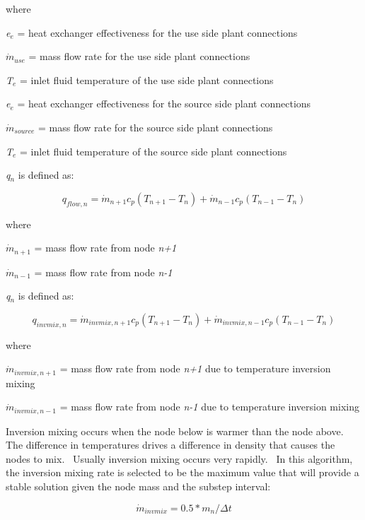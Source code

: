 where

\emph{e\(_{e}\)} = heat exchanger effectiveness for the use side plant connections

\({\dot m_{use}}\) = mass flow rate for the use side plant connections

\emph{T\(_{e}\)} = inlet fluid temperature of the use side plant connections

\emph{e\(_{e}\)} = heat exchanger effectiveness for the source side plant connections

\({\dot m_{source}}\) = mass flow rate for the source side plant connections

\emph{T\(_{e}\)} = inlet fluid temperature of the source side plant connections

\emph{q\(_{n}\)} is defined as:

\begin{equation}
{q_{flow,n}} = {\dot m_{n + 1}}{c_p}({T_{n + 1}} - {T_n}) + {\dot m_{n - 1}}{c_p}({T_{n - 1}} - {T_n})
\end{equation}

where

\({\dot m_{n + 1}}\) = mass flow rate from node \emph{n+1}

\({\dot m_{n - 1}}\) = mass flow rate from node \emph{n-1}

\emph{q\(_{n}\)} is defined as:

\begin{equation}
{q_{invmix,n}} = {\dot m_{invmix,n + 1}}{c_p}({T_{n + 1}} - {T_n}) + {\dot m_{invmix,n - 1}}{c_p}({T_{n - 1}} - {T_n})
\end{equation}

where

\({\dot m_{invmix,n + 1}}\) = mass flow rate from node \emph{n+1} due to temperature inversion mixing

\({\dot m_{invmix,n - 1}}\) = mass flow rate from node \emph{n-1} due to temperature inversion mixing

Inversion mixing occurs when the node below is warmer than the node above.~ The difference in temperatures drives a difference in density that causes the nodes to mix.~ Usually inversion mixing occurs very rapidly.~ In this algorithm, the inversion mixing rate is selected to be the maximum value that will provide a stable solution given the node mass and the substep interval:

\begin{equation}
{\dot m_{invmix}} = 0.5*{m_n}/\Delta t
\end{equation}

